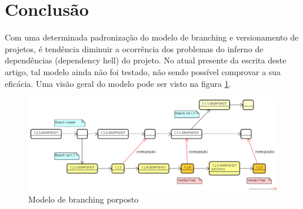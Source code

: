 \section{Conclusão}
\label{sec:conclusao}
Com uma determinada padronização do modelo de branching e versionamento de projetos, é tendência diminuir a ocorrência dos problemas do inferno de dependências (dependency hell) do projeto. No atual presente da escrita deste artigo, tal modelo ainda não foi testado, não sendo possível comprovar a sua eficácia. Uma visão geral do modelo pode ser visto na figura \ref{fig:branching}.

\begin{figure}[h!]
	\centering
	\includegraphics[width=1\linewidth]{img/branching_otojr}
	\caption[Modelo de branching]{Modelo de branching porposto}
	\label{fig:branching}
\end{figure}